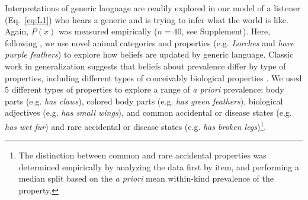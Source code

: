\documentclass[10pt,letterpaper]{article}
\begin{document}
Interpretations of generic language are readily explored in our model of a listener (Eq.~\ref{eq:L1}) who hears a generic and is trying to infer what the world is like. 
Again, $P(x)$ was measured empirically ($n=40$, see Supplement).
Here, following , we use novel animal categories and properties (e.g. \emph{Lorches} and \emph{have purple feathers}) to explore how beliefs are updated by generic language. 
Classic work in generalization suggests that beliefs about prevalence differ by type of properties, including different types of conceivably biological properties \cite{Nisbett1983}. 
We used 5 different types of properties to explore a range of \emph{a priori} prevalence: body parts (e.g. \emph{has claws}), colored body parts (e.g. \emph{has green feathers}), biological adjectives (e.g. \emph{has small wings}), and common accidental or disease states (e.g. \emph{has wet fur}) and rare accidental or disease states (e.g. \emph{has broken legs})\footnote{The distinction between common and rare accidental properties was determined empirically by analyzing the data first by item, and performing a median split based on the \emph{a priori} mean within-kind prevalence of the property.}.
\end{document}
